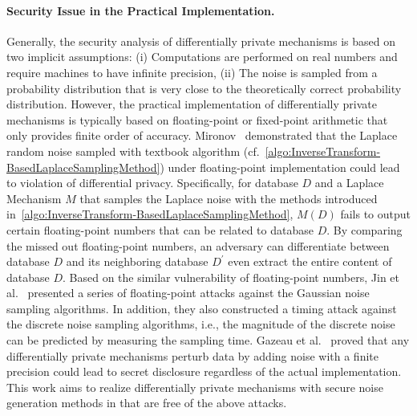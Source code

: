 \paragraph{Security Issue in the Practical Implementation.}
\label{para:SecurityIssueinthePracticalImplementation}
Generally, the security analysis of differentially private mechanisms is based on two implicit assumptions: (i) Computations are performed on real numbers and require machines to have infinite precision, (ii) The noise is sampled from a probability distribution that is very close to the theoretically correct probability distribution.
However, the practical implementation of differentially private mechanisms is typically based on floating-point or fixed-point arithmetic that only provides finite order of accuracy.
Mironov~\cite{mironov2012significance} demonstrated that the Laplace random noise sampled with textbook algorithm (cf.~\autoref{algo:InverseTransform-BasedLaplaceSamplingMethod}) under floating-point implementation could lead to violation of differential privacy.
Specifically, for database $D$ and a Laplace Mechanism $M$ that samples the Laplace noise with the methods introduced in~\autoref{algo:InverseTransform-BasedLaplaceSamplingMethod}, $M\left(D\right) $ fails to output certain floating-point numbers that can be related to database $D$. By comparing the missed out floating-point numbers, an adversary can differentiate between database $D$ and its neighboring database $D^{\prime}$ even extract the entire content of database $D$.
Based on the similar vulnerability of floating-point numbers, Jin et al.~\cite{jin2022we} presented a series of floating-point attacks against the Gaussian noise sampling algorithms. In addition, they also constructed a timing attack against the discrete noise sampling algorithms, i.e., the magnitude of the discrete noise can be predicted by measuring the sampling time.
Gazeau et al.~\cite{gazeau2016preserving} proved that any differentially private mechanisms perturb data by adding noise with a finite precision could lead to secret disclosure regardless of the actual implementation.
This work aims to realize differentially private mechanisms with secure noise generation methods in \smpc that are free of the above attacks.




